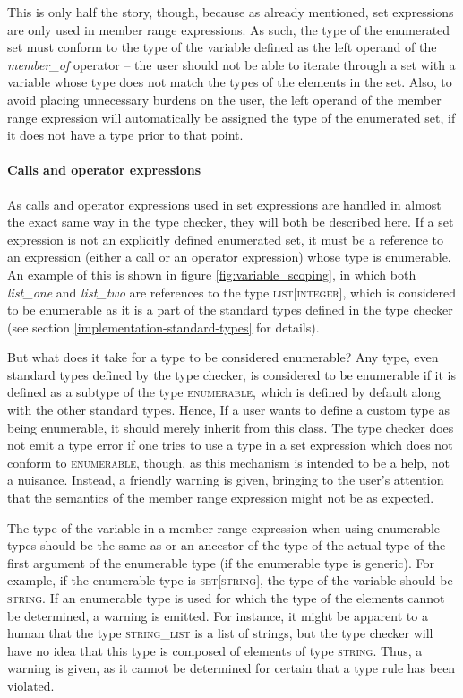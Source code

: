 This is only half the story, though, because as already mentioned, set expressions are only used in member range expressions. As such, the type of the enumerated set must conform to the type of the variable defined as the left operand of the \textit{member\_of} operator -- the user should not be able to iterate through a set with a variable whose type does not match the types of the elements in the set. Also, to avoid placing unnecessary burdens on the user, the left operand of the member range expression will automatically be assigned the type of the enumerated set, if it does not have a type prior to that point.
\paragraph{Calls and operator expressions}
As calls and operator expressions used in set expressions are handled in almost the exact same way in the type checker, they will both be described here. If a set expression is not an explicitly defined enumerated set, it must be a reference to an expression (either a call or an operator expression) whose type is enumerable. An example of this is shown in figure \ref{fig:variable_scoping}, in which both \textit{list\_one} and  \textit{list\_two} are references to the type \textsc{list}[\textsc{integer}], which is considered to be enumerable as it is a part of the standard types defined in the type checker (see section \ref{implementation-standard-types} for details).

But what does it take for a type to be considered enumerable? Any type, even standard types defined by the type checker, is considered to be enumerable if it is defined as a subtype of the type \textsc{enumerable}, which is defined by default along with the other standard types. Hence, If a user wants to define a custom type as being enumerable, it should merely inherit from this class. The type checker does not emit a type error if one tries to use a type in a set expression which does not conform to \textsc{enumerable}, though, as this mechanism is intended to be a help, not a nuisance. Instead, a friendly warning is given, bringing to the user's attention that the semantics of the member range expression might not be as expected.

The type of the variable in a member range expression when using enumerable types should be the same as or an ancestor of the type of the actual type of the first argument of the enumerable type (if the enumerable type is generic). For example, if the enumerable type is \textsc{set}[\textsc{string}], the type of the variable should be \textsc{string}. If an enumerable type is used for which the type of the elements cannot be determined, a warning is emitted. For instance, it might be apparent to a human that the type \textsc{string\_list} is a list of strings, but the type checker will have no idea that this type is composed of elements of type \textsc{string}. Thus, a warning is given, as it cannot be determined for certain that a type rule has been violated.
